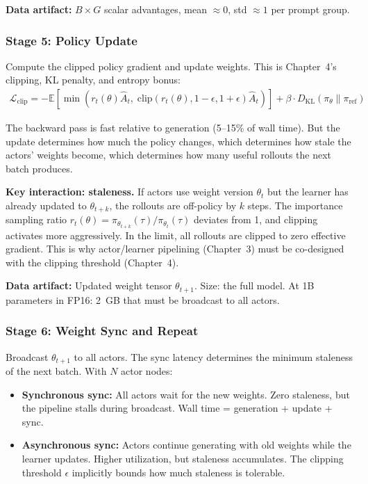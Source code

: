 \textbf{Data artifact:} $B \times G$ scalar advantages, mean $\approx 0$, std $\approx 1$ per prompt group.

\subsubsection*{Stage 5: Policy Update}

Compute the clipped policy gradient and update weights. This is Chapter~4's clipping, KL penalty, and entropy bonus:
\begin{align*}
  \mathcal{L}_{\text{clip}} = -\mathbb{E}\left[\min\left(r_t(\theta)\hat{A}_t,\; \text{clip}(r_t(\theta), 1-\epsilon, 1+\epsilon)\hat{A}_t\right)\right] + \beta \cdot D_{\text{KL}}(\pi_\theta \| \pi_{\text{ref}})
\end{align*}

The backward pass is fast relative to generation (5--15\% of wall time). But the update determines how much the policy changes, which determines how stale the actors' weights become, which determines how many useful rollouts the next batch produces.

\textbf{Key interaction: staleness.} If actors use weight version $\theta_t$ but the learner has already updated to $\theta_{t+k}$, the rollouts are off-policy by $k$ steps. The importance sampling ratio $r_t(\theta) = \pi_{\theta_{t+k}}(\tau) / \pi_{\theta_t}(\tau)$ deviates from 1, and clipping activates more aggressively. In the limit, all rollouts are clipped to zero effective gradient. This is why actor/learner pipelining (Chapter~3) must be co-designed with the clipping threshold (Chapter~4).

\textbf{Data artifact:} Updated weight tensor $\theta_{t+1}$. Size: the full model. At 1B parameters in FP16: 2~GB that must be broadcast to all actors.

\subsubsection*{Stage 6: Weight Sync and Repeat}

Broadcast $\theta_{t+1}$ to all actors. The sync latency determines the minimum staleness of the next batch. With $N$ actor nodes:
\begin{itemize}
  \item \textbf{Synchronous sync:} All actors wait for the new weights. Zero staleness, but the pipeline stalls during broadcast. Wall time = generation + update + sync.
  \item \textbf{Asynchronous sync:} Actors continue generating with old weights while the learner updates. Higher utilization, but staleness accumulates. The clipping threshold $\epsilon$ implicitly bounds how much staleness is tolerable.
\end{itemize}

